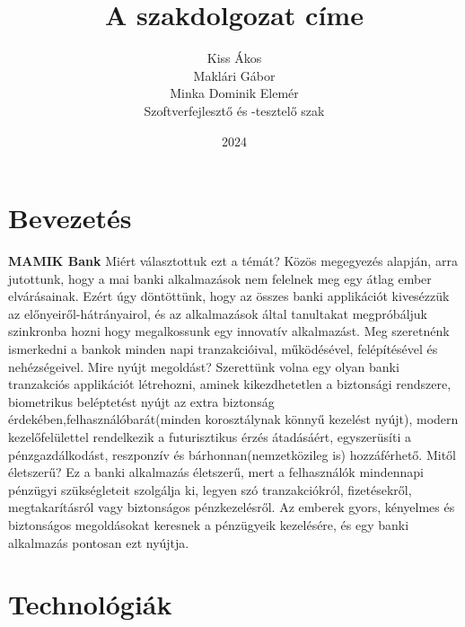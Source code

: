 \documentclass[colorlinks]{thesis-kando}
\theoremstyle{definition}
\theoremstyle{remark}
\begin{document}
\title{A szakdolgozat címe}
\author{Kiss Ákos\\Maklári Gábor\\Minka Dominik Elemér\\Szoftverfejlesztő és -tesztelő szak}
\date{2024}
\maketitle

\tableofcontents

\chapter*{Bevezetés}

\textbf{MAMIK Bank}
\newline\newline
Miért választottuk ezt a témát?
\newline\newline
Közös megegyezés alapján, arra jutottunk, hogy a mai banki alkalmazások nem felelnek meg egy átlag ember elvárásainak.
Ezért úgy döntöttünk, hogy az összes banki applikációt kivesézzük az előnyeiről-hátrányairol, és az alkalmazások által
tanultakat megpróbáljuk szinkronba hozni hogy megalkossunk egy innovatív alkalmazást. Meg szeretnénk ismerkedni a bankok
minden napi tranzakcióival, működésével, felépítésével és nehézségeivel.
Mire nyújt megoldást?
\newline\newline
Szerettünk volna egy olyan banki tranzakciós applikációt létrehozni, aminek kikezdhetetlen a biztonsági rendszere,
biometrikus beléptetést nyújt az extra biztonság érdekében,felhasználóbarát(minden korosztálynak könnyű kezelést nyújt),
modern kezelőfelülettel rendelkezik a futurisztikus érzés átadásáért, egyszerüsíti a pénzgazdálkodást, reszponzív és bárhonnan(nemzetközileg is) hozzáférhető.
Mitől életszerű?
\newline\newline
Ez a banki alkalmazás életszerű, mert a felhasználók mindennapi pénzügyi szükségleteit szolgálja ki, legyen szó tranzakciókról,
fizetésekről, megtakarításról vagy biztonságos pénzkezelésről. Az emberek gyors, kényelmes és biztonságos megoldásokat keresnek a pénzügyeik kezelésére,
és egy banki alkalmazás pontosan ezt nyújtja.
\cite{Fazekas}
\chapter{Technológiák}
\end{document}
